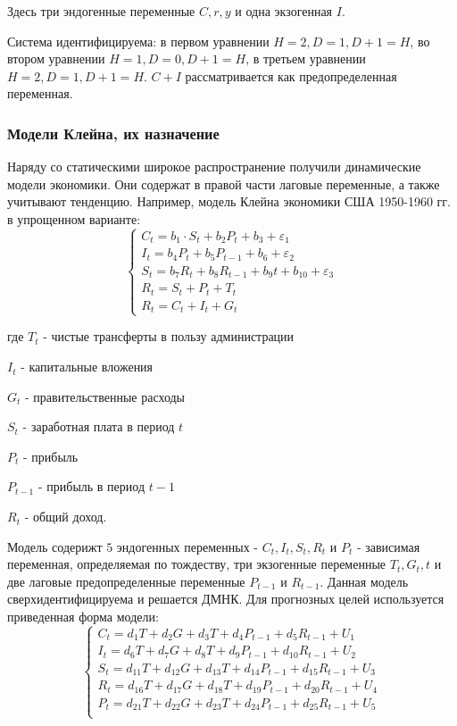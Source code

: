 \documentclass[aps,%
12pt,%
final,%
oneside,
onecolumn,%
musixtex, %
superscriptaddress,%
centertags]{article} %
\theoremstyle{plain}
\theoremstyle{definition}
\theoremstyle{remark}
\begin{document}
Здесь три эндогенные переменные $C,r,y$ и одна экзогенная $I$. 

Система идентифицируема: в первом уравнении $H=2, D = 1, D + 1 = H$, во втором уравнении $H=1, D = 0, D + 1 = H$, в третьем уравнении $H=2, D=1, D + 1 = H$. $C+I$ рассматривается как предопределенная переменная.

\subsubsection{Модели Клейна, их назначение}

Наряду со статическими широкое распространение получили динамические модели экономики. Они содержат в правой части лаговые переменные, а также учитывают тенденцию. Например, модель Клейна экономики США 1950-1960 гг. в упрощенном варианте:
$$\begin{cases}
	C_t = b_1 \cdot S_t + b_2P_t + b_3 + \varepsilon_1 \\
	I_t = b_4P_t + b_5P_{t-1} + b_6 + \varepsilon_2 \\
	S_t = b_7R_t + b_8R_{t-1}+b_9t+b_{10} + \varepsilon_3\\
	R_t = S_t + P_t + T_t \\
	R_t = C_t + I_t + G_t
\end{cases}$$

где $T_t$ - чистые трансферты в пользу администрации

$I_t$ - капитальные вложения

$G_t$ - правительственные расходы

$S_t$ - заработная плата в период $t$

$P_t$ - прибыль

$P_{t-1}$ - прибыль в период $t-1$

$R_t$ - общий доход.

Модель содерижт $5$ эндогенных переменных - $C_t,I_t,S_t,R_t$ и $P_t$ - зависимая переменная, определяемая по тождеству, три экзогенные переменные $T_t,G_t,t$ и две лаговые предопределенные переменные $P_{t-1}$ и $R_{t-1}$. Данная модель сверхидентифицируема и решается ДМНК. Для прогнозных целей используется приведенная форма модели:
$$\begin{cases}
	C_t = d_1T + d_2 G +d_3T +d_4P_{t-1} +d_5R_{t-1} +U_1 \\
	I_t = d_6T + d_7 G +d_8T +d_9P_{t-1} +d_{10}R_{t-1} +U_2 \\
	S_t = d_{11}T + d_{12} G +d_{13}T +d_{14}P_{t-1} +d_{15}R_{t-1} +U_3 \\
	R_t = d_{16}T + d_{17} G +d_{18}T +d_{19}P_{t-1} +d_{20}R_{t-1} +U_4 \\
	P_t = d_{21}T + d_{22} G +d_{23}T +d_{24}P_{t-1} +d_{25}R_{t-1} +U_5 \\
\end{cases}$$
\end{document}
